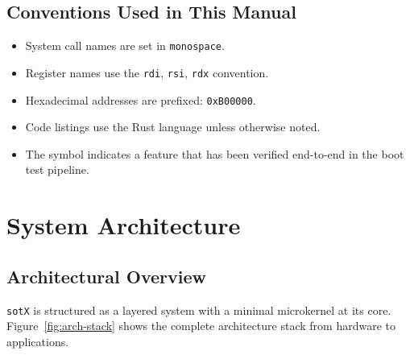 \documentclass[11pt,a4paper,twoside]{report}
\theoremstyle{definition}
\newcommand{\sotX}{\texttt{sotX}}
\newcommand{\sotX}{\texttt{sotX}}
\newcommand{\syscall}[1]{\texttt{#1}}
\newcommand{\reg}[1]{\texttt{#1}}
\newcommand{\hex}[1]{\texttt{0x#1}}
\newcommand{\cmark}{\color{tngreen}\checkmark}
\begin{document}
\section{Conventions Used in This Manual}

\begin{itemize}[leftmargin=1.4em]
  \item System call names are set in \syscall{monospace}.
  \item Register names use the \reg{rdi}, \reg{rsi}, \reg{rdx} convention.
  \item Hexadecimal addresses are prefixed: \hex{B00000}.
  \item Code listings use the Rust language unless otherwise noted.
  \item The symbol \cmark{} indicates a feature that has been verified
        end-to-end in the boot test pipeline.
\end{itemize}


\chapter{System Architecture}
\label{ch:arch}

\section{Architectural Overview}

\sotX{} is structured as a layered system with a minimal microkernel at its
core. Figure~\ref{fig:arch-stack} shows the complete architecture stack from
hardware to applications.
\end{document}
